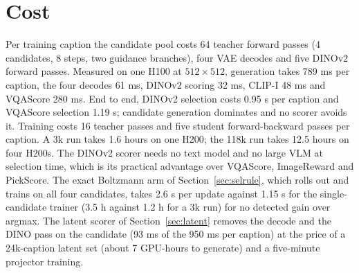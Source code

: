 \documentclass[11pt,a4paper]{article}
\begin{document}
\section{Cost}
\label{sec:cost}
Per training caption the candidate pool costs 64 teacher forward passes (4 candidates, 8 steps, two guidance branches), four VAE decodes and five DINOv2 forward passes. Measured on one H100 at $512\times512$, generation takes 789 ms per caption, the four decodes 61 ms, DINOv2 scoring 32 ms, CLIP-I 48 ms and VQAScore 280 ms. End to end, DINOv2 selection costs 0.95 s per caption and VQAScore selection 1.19 s; candidate generation dominates and no scorer avoids it. Training costs 16 teacher passes and five student forward-backward passes per caption. A 3k run takes 1.6 hours on one H200; the 118k run takes 12.5 hours on four H200s. The DINOv2 scorer needs no text model and no large VLM at selection time, which is its practical advantage over VQAScore, ImageReward and PickScore. The exact Boltzmann arm of Section~\ref{sec:selrule}, which rolls out and trains on all four candidates, takes 2.6 s per update against 1.15 s for the single-candidate trainer (3.5 h against 1.2 h for a 3k run) for no detected gain over argmax. The latent scorer of Section~\ref{sec:latent} removes the decode and the DINO pass on the candidate (93 ms of the 950 ms per caption) at the price of a 24k-caption latent set (about 7 GPU-hours to generate) and a five-minute projector training.
\end{document}
